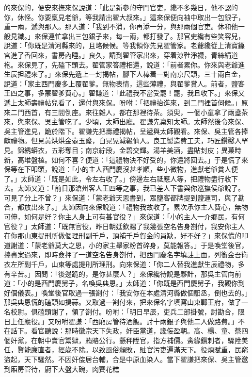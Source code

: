 的來保的，便安來撫來保說道：「此是新參的守門官吏，纔不多幾日，他不認的你，休怪。你要稟見老爺，等我請出翟大叔來。」這來保便向袖中取出一包銀子，重一兩，遞與那人。那人道：「我到不消，你再添一分，與那兩個官吏。休和他一般見識。」來保連忙拿出三包銀子來，每一兩，都打發了。那官吏纔有些笑容兒，說道：「你既是清河縣來的，且略候候。等我領你先見翟管家。老爺纔從上清寶籙宮進了香回來，書房內睡。」良久，請到翟管家出來，穿着涼鞋淨襪，青絲絹道袍。來保見了，先磕下頭去。翟管家答禮相還，說道：「前者累你。你來與老爺進生辰担禮來了。」來保先遞上一封揭帖，腳下人棒着一對南京尺頭，三十兩白金，說道：「家主西門慶多上覆翟爹。無物表情，這些薄禮，與翟爹賞人。前者，鹽客王四之事，多蒙翟爹費心。」翟謙道：「此禮我不當受罷！罷，我且收下。」來保又遞上太師壽禮帖兒看了，還付與來保。吩咐：「把禮抬進來，到二門裡首伺候。」原來二門西首，有三間倒座。來往雜人，都在那裡待茶。須臾，一個小童拿了兩盞茶來，與來保、吳主管吃了。少頃，太師出廳。翟謙先稟知太師。太師然後令來保、吳主管進見，跪於階下。翟謙先把壽禮揭帖，呈遞與太師觀看。來保、吳主管各捧獻禮物。但見黃烘烘金壺玉盞，白晃晃減靸仙人。良工製造費工夫，巧匠鑽鑿人罕見。錦綉蟒衣，五彩奪目；南京紵段，金碧交輝。湯羊美酒，盡貼封皮；異菓時新，高堆盤榼。如何不喜？便道：「這禮物決不好受的，你還將回去。」于是慌了來保等在下叩頭，說道：「小的主人西門慶沒甚孝順，些小微物，進獻老爺賞人便了。」太師道：「既是如此，令左右收了。」傍邊左右祗應人等，把禮物盡行收下去。太師又道：「前日那滄州客人王四等之事，我已差人下書與你巡撫侯爺說了。可見了分上不曾？」來保道：「蒙老爺天恩書到，眾鹽客都牌提到鹽運司，與了勘合，都放出來了。」太師因向來保說道：「禮物我故收了。累次承你主人費心，無物可伸，如何是好？你主人身上可有甚官役？」來保道：「小的主人一介鄉民，有何官役？」太師道：「既無官役，昨日朝廷欽賜了我幾張空名告身劄付，我安你主人在你那山東提刑所做個理刑副千戶，頂補千戶賀金的員缺，好不好？」來保慌的叩道謝道：「蒙老爺莫大之恩，小的家主舉家粉首碎身，莫能報答。」于是喚堂後官，擡書案過來，即時僉押了一道空名告身劄付，把西門慶名字填註上面，列銜金吾衛衣左所副千戶，山東等處提刑所理刑。向來保道：「你二人替我進獻生辰禮物，多有辛苦。」因問：「後邊跪的，是你甚麼人？」來保纔待說是夥計，那吳主管向前道：「小的是西門慶舅子，名喚吳典恩。」太師道：「你既是西門慶舅子，我觀你到好個儀表。」喚堂後官取過一張劄付：「我安你在本處清河縣做個馹丞，倒也去的。」那吳典恩慌的磕頭如搗蒜。又取過一劄付來，把來保名字填寫山東鄆王府，做了一名校尉。俱磕頭謝了，領了劄付。吩咐：「明日早辰，吏兵二部掛號，討勘合，限日上任應役。」又吩咐翟謙：「西廂房管待酒飯。討十兩銀子與他二人做路費。」不在話下。看官聽說：那時徽宗天下失政，奸臣當道，讒侫盈朝。高、楊、童、蔡四個奸黨，在朝中賣官鬻獄，賄賂公行。懸秤陞官，指方補價。夤緣鑽刺者，驟陞美任，賢能廉直者，經歲不除。以致風俗頹敗，賍官污吏遍滿天下。役煩賦重，民窮盜起，天下騷然。不因奸侫居台輔，合是中原血染人。當下翟謙把來保、吳主管邀到廂房管待，廚下大盤大碗，肉賽花糕 